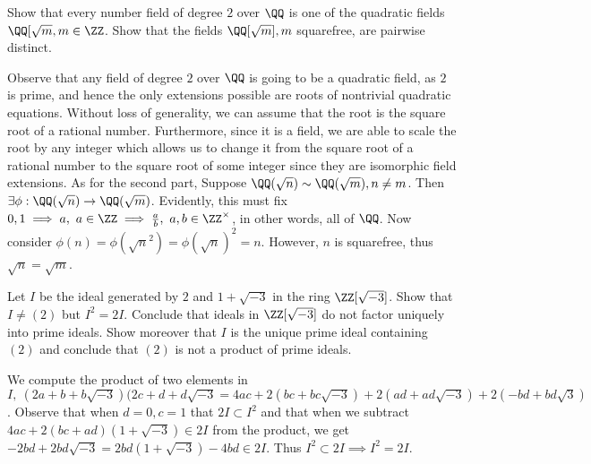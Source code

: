 \begin{problem}
Show that every number field of degree \(2\) over \(\QQ\) is one of the quadratic fields \(\QQ[\sqrt{m}, m \in \ZZ\). Show that the fields \(\QQ[\sqrt{m}], m\) squarefree, are pairwise distinct. 
\end{problem}
Observe that any field of degree \(2\) over \(\QQ\) is going to be a quadratic field, as \(2\) is prime, and hence the only extensions possible are roots of nontrivial quadratic equations. Without loss of generality, we can assume that the root is the square root of a rational number. Furthermore, since it is a field, we are able to scale the root by any integer which allows us to change it from the square root of a rational number to the square root of some integer since they are isomorphic field extensions. As for the second part, Suppose \(\QQ(\sqrt{n}) \sim \QQ(\sqrt{m}), n \ne m\). Then \(\exists \phi: \QQ(\sqrt{n}) \to \QQ(\sqrt{m})\). Evidently, this must fix \(0,1 \implies a,\ a \in \ZZ \implies \frac{a}{b},\ a,b \in \ZZ^{\times}\), in other words, all of \(\QQ\). Now consider \(\phi(n)=\phi(\sqrt{n}^2)=\phi(\sqrt{n})^2 = n\). However, \(n\) is squarefree, thus \(\sqrt{n}=\sqrt{m}\).
\begin{problem}
Let \(I\) be the ideal generated by \(2\) and \(1+\sqrt{-3}\) in the ring \(\ZZ[\sqrt{-3}]\). Show that \(I \ne (2)\) but \(I^2=2I\). Conclude that ideals in \(\ZZ[\sqrt{-3}]\) do not factor uniquely into prime ideals. Show moreover that \(I\) is the unique prime ideal containing \((2)\) and conclude that \((2)\) is not a product of prime ideals.
\end{problem}
We compute the product of two elements in \(I, \ (2a+b+b\sqrt{-3})(2c+d+d\sqrt{-3}=4ac+2(bc+bc\sqrt{-3})+2(ad+ad\sqrt{-3})+2(-bd+bd\sqrt{3})\). Observe that when \(d=0, c = 1\) that \( 2I \subset I^2\) and that when we subtract \(4ac+2(bc+ad)(1+\sqrt{-3}) \in 2I \) from the product, we get \(-2bd+2bd\sqrt{-3} = 2bd(1+\sqrt{-3})-4bd \in 2I\). Thus \(I^2 \subset 2I \implies I^2=2I\).

